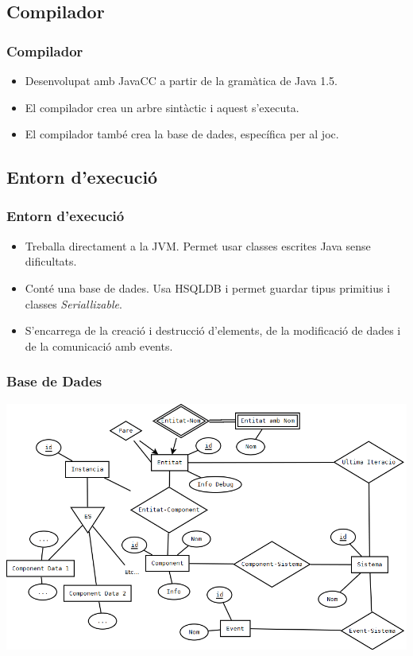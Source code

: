 \documentclass[serif,9pt]{beamer}
\begin{document}
  \subsection{Compilador}
    \begin{frame}\frametitle{Compilador}
      \begin{itemize}
        \item Desenvolupat amb JavaCC a partir de la gramàtica de Java 1.5.\pause
        \item El compilador crea un arbre sintàctic i aquest s'executa.\pause
        \item El compilador també crea la base de dades, específica per al joc.
      \end{itemize}
    \end{frame}
    
  \subsection{Entorn d'execució}
    
    \begin{frame}\frametitle{Entorn d'execució}
      \begin{itemize}
        \item Treballa directament a la JVM. Permet usar classes escrites Java sense dificultats. \pause
        \item Conté una base de dades. Usa HSQLDB i permet guardar tipus primitius i classes {\em Seriallizable}. \pause
        \item S'encarrega de la creació i destrucció d'elements, de la modificació de dades i de la comunicació amb events.
      \end{itemize}
    \end{frame}

    
    \begin{frame}\frametitle{Base de Dades}
      \includegraphics[width=1.00\textwidth]{./img/EntitatRelacio2.png}
    \end{frame}
\end{document}
